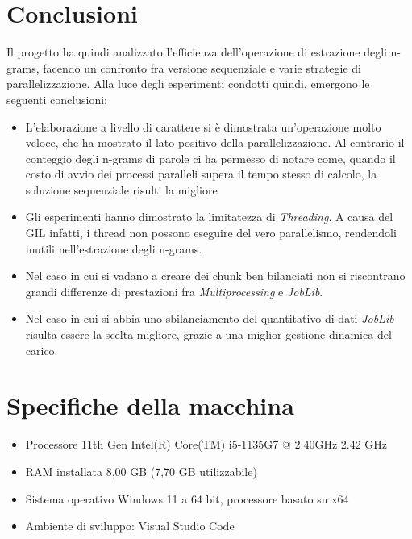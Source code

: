 \documentclass[10pt,twocolumn,letterpaper]{article}
\begin{document}

\section{Conclusioni}
Il progetto ha quindi analizzato l'efficienza dell'operazione di estrazione degli n-grams, facendo un confronto fra versione sequenziale e varie strategie di parallelizzazione.
Alla luce degli esperimenti condotti quindi, emergono le seguenti conclusioni:
\begin{itemize}
   \item L'elaborazione a livello di carattere si è dimostrata un'operazione molto veloce, che ha mostrato il lato positivo della parallelizzazione. Al contrario il conteggio degli n-grams di parole ci ha permesso di notare come, quando il costo di avvio dei processi paralleli supera il tempo stesso di calcolo, la soluzione sequenziale risulti la migliore
   \item Gli esperimenti hanno dimostrato la limitatezza di \textit{Threading}. A causa del GIL infatti, i thread non possono eseguire del vero parallelismo, rendendoli inutili nell'estrazione degli n-grams. 
   \item Nel caso in cui si vadano a creare dei chunk ben bilanciati non si riscontrano grandi differenze di prestazioni fra \textit{Multiprocessing} e \textit{JobLib}.
   \item Nel caso in cui si abbia uno sbilanciamento del quantitativo di dati \textit{JobLib} risulta essere la scelta migliore, grazie a una miglior gestione dinamica del carico.
\end{itemize}

\section{Specifiche della macchina}

\begin{itemize}
   \item Processore 11th Gen Intel(R) Core(TM) i5-1135G7 @ 2.40GHz 2.42 GHz
   \item RAM installata 8,00 GB (7,70 GB utilizzabile)
   \item Sistema operativo Windows 11 a 64 bit, processore basato su x64
   \item Ambiente di sviluppo: Visual Studio Code
\end{itemize}
\end{document}
